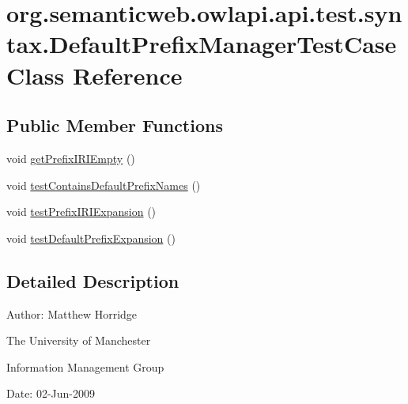 \hypertarget{classorg_1_1semanticweb_1_1owlapi_1_1api_1_1test_1_1syntax_1_1_default_prefix_manager_test_case}{\section{org.\-semanticweb.\-owlapi.\-api.\-test.\-syntax.\-Default\-Prefix\-Manager\-Test\-Case Class Reference}
\label{classorg_1_1semanticweb_1_1owlapi_1_1api_1_1test_1_1syntax_1_1_default_prefix_manager_test_case}
}
\subsection*{Public Member Functions}
\begin{DoxyCompactItemize}
\item 
void \hyperlink{classorg_1_1semanticweb_1_1owlapi_1_1api_1_1test_1_1syntax_1_1_default_prefix_manager_test_case_ae418f774b93dad89a08fba1679df4738}{get\-Prefix\-I\-R\-I\-Empty} ()
\item 
void \hyperlink{classorg_1_1semanticweb_1_1owlapi_1_1api_1_1test_1_1syntax_1_1_default_prefix_manager_test_case_ad9cdbcf26b40fbb6a30c7e86f66886af}{test\-Contains\-Default\-Prefix\-Names} ()
\item 
void \hyperlink{classorg_1_1semanticweb_1_1owlapi_1_1api_1_1test_1_1syntax_1_1_default_prefix_manager_test_case_acfb0c87edf6eff6ad79885b004a425cd}{test\-Prefix\-I\-R\-I\-Expansion} ()
\item 
void \hyperlink{classorg_1_1semanticweb_1_1owlapi_1_1api_1_1test_1_1syntax_1_1_default_prefix_manager_test_case_afb620ebdb84ea3b83b70fd18cdbffd98}{test\-Default\-Prefix\-Expansion} ()
\end{DoxyCompactItemize}


\subsection{Detailed Description}
Author\-: Matthew Horridge\par
 The University of Manchester\par
 Information Management Group\par
 Date\-: 02-\/\-Jun-\/2009 

